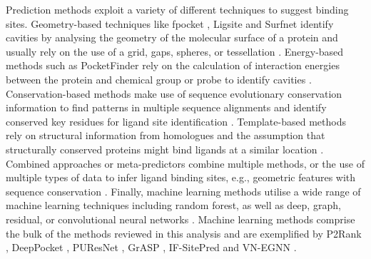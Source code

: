 Prediction methods exploit a variety of different techniques to suggest binding sites. Geometry-based techniques like fpocket \cite{GUILLOUX_2009_FPOCKET}, Ligsite \cite{HENDLICH_1997_LIGSITE} and Surfnet \cite{LASKOWSKI_1995_SURFNET} identify cavities by analysing the geometry of the molecular surface of a protein and usually rely on the use of a grid, gaps, spheres, or tessellation \cite{GUILLOUX_2009_FPOCKET, LIANG_1998_CAVITIES, HENDLICH_1997_LIGSITE, LASKOWSKI_1995_SURFNET, KLEYWEGT_1994_CAVITIES, LEVITT_1992_POCKET, BRADY_2000_PASS, WEISEL_2007_POCKETPICKER}. Energy-based methods such as PocketFinder \cite{AN_2005_POCKETFINDER} rely on the calculation of interaction energies between the protein and chemical group or probe to identify cavities \cite{AN_2005_POCKETFINDER, GOODFORD_1982_PREDICTOR, AN_2004_PREDICTOR, LAURIE_2005_QSITEFINDER, GHERSI_2009_SITEHOUND, NGAN_2012_FTSITE}. Conservation-based methods make use of sequence evolutionary conservation information to find patterns in multiple sequence alignments and identify conserved key residues for ligand site identification \cite{ARMON_2001_CONSURF, PUPKO_2002_RATE4SITE, XIE_2012_CONSPRED}. Template-based methods rely on structural information from homologues and the assumption that structurally conserved proteins might bind ligands at a similar location \cite{ZVELEBIL_1987_PREDICTION, WASS_2010_3DLIGANDSITE, ROY_2012_COFACTOR, YANG_2013_COFACTOR, LEE_2013_PREDICTION, BRYLINSKI_2013_EFINDSITE}. Combined approaches or meta-predictors combine multiple methods, or the use of multiple types of data to infer ligand binding sites, e.g., geometric features with sequence conservation \cite{GUTTERIDGE_2003_LBSP, HUANG_2006_BU48, GLASER_2006_PREDICTION, HALGREN_2009_PREDICITON, CAPRA_2009_CONCAVITY, HUANG_2009_METAPOCKET, BRAY_2009_SITESIDENTIFY, BRYLINSKI_2009_FINDSITE}. Finally, machine learning methods utilise a wide range of machine learning techniques including random forest, as well as deep, graph, residual, or convolutional neural networks \cite{KRIVAK_2015_P2RANK, JIMENEZ_2017_DEEPSITE, KRIVAK_2018_P2RANK, STEPNIEWSKA_2020_KALASANTY, KOZLOVSKII_2020_BITENET, SANTANA_2020_GRaSP, KANDEL_2021_PURESNET, MYOLNAS_2021_DEEPSURF, YAN_2022_POINTSITE, LI_2022_RECURPOCKET, AGGARWAL_2022_DEEPPOCKET, EVTEEV_2023_SITERADAR, ABDOLLAHI_2023_NODECODER, LI_2023_GLPOCKET,  LIU_2023_REFINEPOCKET, YAN_2024_EQUIPOCKET, SMITH_2024_GrASP, CARBERY_2024_IFSP, SESTAK_2024_VNEGNN, KANDEL_2024_PURESNET}. Machine learning methods comprise the bulk of the methods reviewed in this analysis and are exemplified by P2Rank \cite{KRIVAK_2015_P2RANK, KRIVAK_2018_P2RANK}, DeepPocket \cite{AGGARWAL_2022_DEEPPOCKET}, PUResNet \cite{KANDEL_2021_PURESNET, KANDEL_2024_PURESNET}, GrASP \cite{SMITH_2024_GrASP}, IF-SitePred \cite{CARBERY_2024_IFSP} and VN-EGNN \cite{SESTAK_2024_VNEGNN}.

